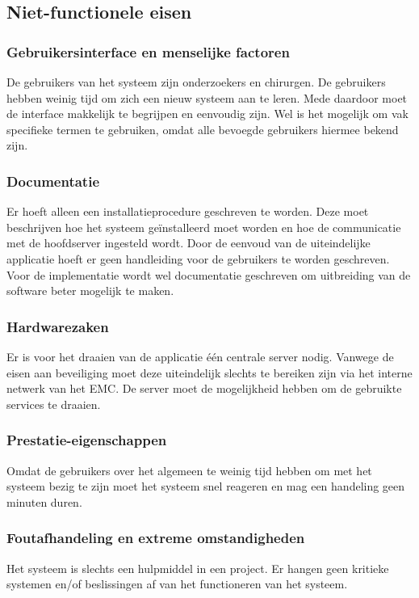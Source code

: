 \subsection{Niet-functionele eisen}
\label{nietfunctioneleeisen}

\subsubsection{Gebruikersinterface en menselijke factoren}
De gebruikers van het systeem zijn onderzoekers en chirurgen. 
De gebruikers hebben weinig tijd om zich een nieuw systeem aan te leren. 
Mede daardoor moet de interface makkelijk te begrijpen en eenvoudig zijn. 
Wel is het mogelijk om vak specifieke termen te gebruiken, omdat alle bevoegde gebruikers hiermee bekend zijn.

\subsubsection{Documentatie}
Er hoeft alleen een installatieprocedure geschreven te worden. 
Deze moet beschrijven hoe het systeem ge\"installeerd moet worden en hoe de communicatie met de hoofdserver ingesteld wordt. 
Door de eenvoud van de uiteindelijke applicatie hoeft er geen handleiding voor de gebruikers te worden geschreven.
Voor de implementatie wordt wel documentatie geschreven om uitbreiding van de software beter mogelijk te maken.

\subsubsection{Hardwarezaken}
Er is voor het draaien van de applicatie \'e\'en centrale server nodig.
Vanwege de eisen aan beveiliging moet deze uiteindelijk slechts te bereiken zijn via het interne netwerk van het EMC. 
De server moet de mogelijkheid hebben om de gebruikte services te draaien. 

\subsubsection{Prestatie-eigenschappen}
Omdat de gebruikers over het algemeen te weinig tijd hebben om met het systeem bezig te zijn moet het systeem snel reageren en mag een handeling geen minuten duren.

\subsubsection{Foutafhandeling en extreme omstandigheden}
Het systeem is slechts een hulpmiddel in een project. 
Er hangen geen kritieke systemen en/of beslissingen af van het functioneren van het systeem.

